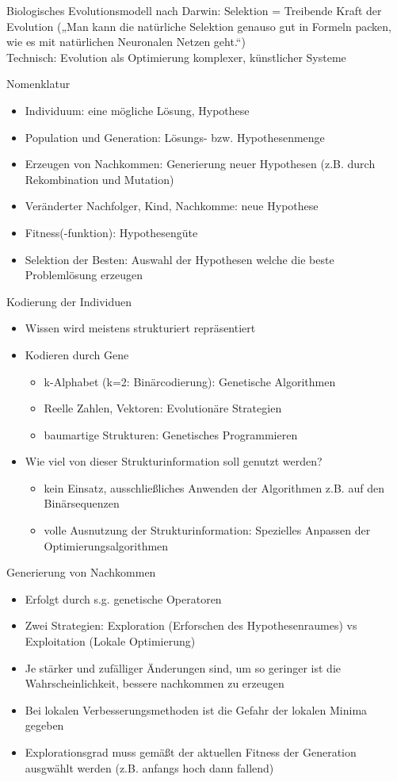 \documentclass[paper=a4, fontsize=11pt]{scrartcl} %
\numberwithin{equation}{section} %
\numberwithin{figure}{section} %
\numberwithin{table}{section} %
\begin{document}
Biologisches Evolutionsmodell nach Darwin: Selektion = Treibende Kraft der Evolution („Man kann die natürliche Selektion genauso gut in Formeln packen, wie es mit natürlichen Neuronalen Netzen geht.“)\\ 
Technisch: Evolution als Optimierung komplexer, künstlicher Systeme

Nomenklatur
\begin{itemize}
\item Individuum: eine mögliche Lösung, Hypothese
\item Population und Generation: Lösungs- bzw. Hypothesenmenge
\item Erzeugen von Nachkommen: Generierung neuer Hypothesen (z.B. durch Rekombination und Mutation)
\item Veränderter Nachfolger, Kind, Nachkomme: neue Hypothese
\item Fitness(-funktion): Hypothesengüte
\item Selektion der Besten: Auswahl der Hypothesen welche die beste Problemlösung erzeugen
\end{itemize}

Kodierung der Individuen
\begin{itemize}
\item Wissen wird meistens strukturiert repräsentiert
\item Kodieren durch Gene
\begin{itemize}
\item k-Alphabet (k=2: Binärcodierung): Genetische Algorithmen
\item Reelle Zahlen, Vektoren: Evolutionäre Strategien
\item baumartige Strukturen: Genetisches Programmieren
\end{itemize}
\item Wie viel von dieser Strukturinformation soll genutzt werden?
\begin{itemize}
\item kein Einsatz, ausschließliches Anwenden der Algorithmen z.B. auf den Binärsequenzen
\item volle Ausnutzung der Strukturinformation: Spezielles Anpassen der Optimierungsalgorithmen
\end{itemize}
\end{itemize}

Generierung von Nachkommen
\begin{itemize}
\item Erfolgt durch s.g. genetische Operatoren
\item Zwei Strategien: Exploration (Erforschen des Hypothesenraumes) vs Exploitation (Lokale Optimierung)
\item Je stärker und zufälliger Änderungen sind, um so geringer ist die Wahrscheinlichkeit, bessere nachkommen zu erzeugen
\item Bei lokalen Verbesserungsmethoden ist die Gefahr der lokalen Minima gegeben
\item Explorationsgrad muss gemäßt der aktuellen Fitness der Generation ausgwählt werden (z.B. anfangs hoch dann fallend)
\end{itemize}
\end{document}
